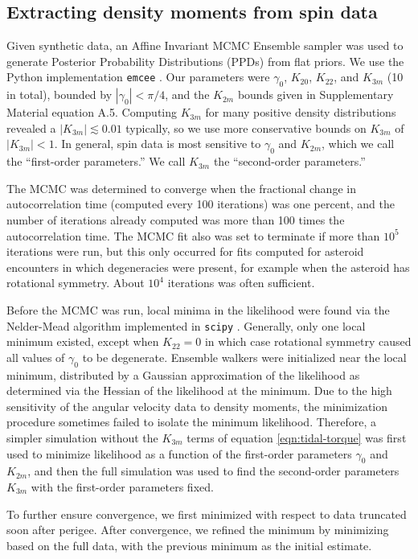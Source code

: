 \documentclass[fleqn,usenatbib]{mnras}
\begin{document}
\subsection{Extracting density moments from spin data}
\label{sec:fit}
Given synthetic data, an Affine Invariant MCMC Ensemble sampler was used to generate Posterior Probability Distributions (PPDs) from flat priors. We use the Python implementation \texttt{emcee} \citep{foreman2013emcee}. Our parameters were $\gamma_0$, $K_{20}$, $K_{22}$, and $K_{3m}$ (10 in total), bounded by $|\gamma_0| < \pi/4$, and the $K_{2 m}$ bounds given in Supplementary Material equation A.5. Computing $K_{3m}$ for many positive density distributions revealed a $|K_{3m}| \lesssim 0.01$ typically, so we use more conservative bounds on $K_{3 m}$ of $|K_{3 m}| < 1$. In general, spin data is most sensitive to $\gamma_0$ and $K_{2m}$, which we call the ``first-order parameters.'' We call $K_{3m}$ the ``second-order parameters.''

The MCMC was determined to converge when the fractional change in autocorrelation time (computed every 100 iterations) was one percent, and the number of iterations already computed was more than 100 times the autocorrelation time. The MCMC fit also was set to terminate if more than $10^5$ iterations were run, but this only occurred for fits computed for asteroid encounters in which degeneracies were present, for example when the asteroid has rotational symmetry. About $10^4$ iterations was often sufficient.

Before the MCMC was run, local minima in the likelihood were found via the Nelder-Mead algorithm implemented in \texttt{scipy} \citep{Gao2012}. Generally, only one local minimum existed, except when $K_{22}=0$ in which case rotational symmetry caused all values of $\gamma_0$ to be degenerate. Ensemble walkers were initialized near the local minimum, distributed by a Gaussian approximation of the likelihood as determined via the Hessian of the likelihood at the minimum. Due to the high sensitivity of the angular velocity data to density moments, the minimization procedure sometimes failed to isolate the minimum likelihood. Therefore, a simpler simulation without the $K_{3m}$ terms of equation \ref{eqn:tidal-torque} was first used to minimize likelihood as a function of the first-order parameters $\gamma_0$ and $K_{2m}$, and then the full simulation was used to find the second-order parameters $K_{3m}$ with the first-order parameters fixed.

To further ensure convergence, we first minimized with respect to data truncated soon after perigee. After convergence, we refined the minimum by minimizing based on the full data, with the previous minimum as the initial estimate.
\end{document}

